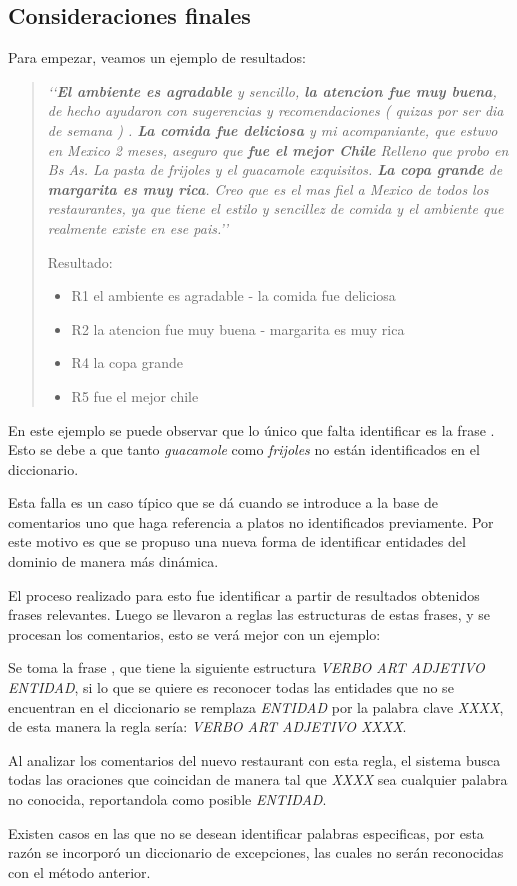 \subsection{Consideraciones finales}

Para empezar, veamos un ejemplo de resultados:

\begin{quotation}

\emph{
\lq{}\lq{}{\bf El ambiente es agradable} y sencillo, {\bf la atencion fue muy buena}, de hecho ayudaron con sugerencias y recomendaciones ( quizas por ser dia de semana ) .  {\bf La comida fue deliciosa} y mi acompaniante, que estuvo en Mexico 2 meses, aseguro que {\bf fue el mejor Chile} Relleno que probo en Bs As. La pasta de frijoles y el guacamole exquisitos. {\bf La copa grande} de {\bf margarita es muy rica}. Creo que es el mas fiel a Mexico de todos los restaurantes, ya que tiene el estilo y sencillez de comida y el ambiente que realmente existe en ese pais.\rq{}\rq{}
}

Resultado:
\begin{itemize}
\item R1  el ambiente es agradable - la comida fue deliciosa
\item R2  la atencion fue muy buena - margarita es muy rica
\item R4  la copa grande
\item R5  fue el mejor chile
\end{itemize}

\end{quotation}

En este ejemplo se puede observar que lo único que falta identificar es la frase . Esto se debe a que tanto \emph{guacamole} como \emph{frijoles} no están identificados en el diccionario.

Esta falla es un caso típico que se dá cuando se introduce a la base de comentarios uno que haga referencia a platos no identificados previamente. Por este motivo es que se propuso una nueva forma de identificar entidades del dominio de manera más dinámica.

El proceso realizado para esto fue identificar a partir de resultados obtenidos frases relevantes. Luego se llevaron a reglas las estructuras de estas frases, y se procesan los comentarios, esto se verá mejor con un ejemplo:

Se toma la frase , que tiene la siguiente estructura \emph{VERBO ART ADJETIVO ENTIDAD}, si lo que se quiere es reconocer todas las entidades que no se encuentran en el diccionario se remplaza \emph{ENTIDAD} por la palabra clave \emph{XXXX}, de esta manera la regla sería: \emph{VERBO ART ADJETIVO XXXX}. 

Al analizar los comentarios del nuevo restaurant con esta regla, el sistema busca todas las oraciones que coincidan de manera tal que \emph{XXXX} sea cualquier palabra no conocida, reportandola como posible \emph{ENTIDAD}.

Existen casos en las que no se desean identificar palabras especificas, por esta razón se incorporó un diccionario de excepciones, las cuales no serán reconocidas con el método anterior.
